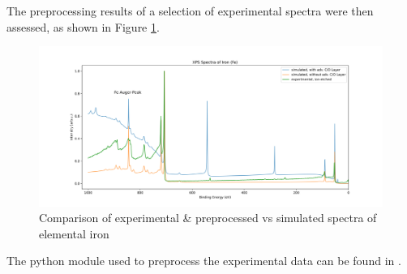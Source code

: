 The preprocessing results of a selection of experimental spectra were then assessed, as shown in Figure \ref{fig:ex_vs_sim}.

\begin{figure}
    \includegraphics[width=\textwidth]{Figures/Fe_XPS.png}
    \caption{Comparison of experimental \& preprocessed vs simulated spectra of elemental iron}
    \label{fig:ex_vs_sim}
    \centering
\end{figure}

The python module used to preprocess the experimental data can be found in .